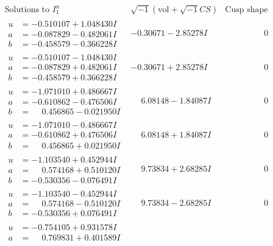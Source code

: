 \documentclass[1p]{elsarticle_modified}
\theoremstyle{definition}
\newcommand{\I}{\sqrt{-1}}
\begin{document}
$$\begin{array}{c|c|c}
\text{Solutions to }I^u_{1}& \I (\text{vol} + \sqrt{-1}CS) & \text{Cusp shape}\\
 \hline 
\begin{aligned}
u &= -0.510107 + 1.048430 I \\
a &= -0.087829 - 0.482061 I \\
b &= -0.458579 - 0.366228 I\end{aligned}
 & -0.30671 - 2.85278 I & \phantom{-0.000000 } 0 \\ \hline\begin{aligned}
u &= -0.510107 - 1.048430 I \\
a &= -0.087829 + 0.482061 I \\
b &= -0.458579 + 0.366228 I\end{aligned}
 & -0.30671 + 2.85278 I & \phantom{-0.000000 } 0 \\ \hline\begin{aligned}
u &= -1.071010 + 0.486667 I \\
a &= -0.610862 - 0.476506 I \\
b &= \phantom{-}0.456865 - 0.021950 I\end{aligned}
 & \phantom{-}6.08148 - 1.84087 I & \phantom{-0.000000 } 0 \\ \hline\begin{aligned}
u &= -1.071010 - 0.486667 I \\
a &= -0.610862 + 0.476506 I \\
b &= \phantom{-}0.456865 + 0.021950 I\end{aligned}
 & \phantom{-}6.08148 + 1.84087 I & \phantom{-0.000000 } 0 \\ \hline\begin{aligned}
u &= -1.103540 + 0.452944 I \\
a &= \phantom{-}0.574168 + 0.510120 I \\
b &= -0.530356 - 0.076491 I\end{aligned}
 & \phantom{-}9.73834 + 2.68285 I & \phantom{-0.000000 } 0 \\ \hline\begin{aligned}
u &= -1.103540 - 0.452944 I \\
a &= \phantom{-}0.574168 - 0.510120 I \\
b &= -0.530356 + 0.076491 I\end{aligned}
 & \phantom{-}9.73834 - 2.68285 I & \phantom{-0.000000 } 0 \\ \hline\begin{aligned}
u &= -0.754105 + 0.931578 I \\
a &= \phantom{-}0.769831 + 0.401589 I \\

\end{aligned}
\end{array}$$
\end{document}
